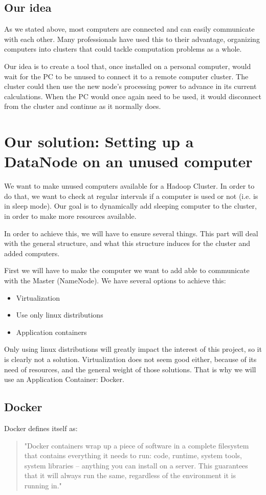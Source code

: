 \documentclass[11pt]{report} %
\begin{document}
\section{Our idea}
As we stated above, most computers are connected and can easily communicate with each other. Many professionals have used this to their advantage, organizing computers into clusters that could tackle computation problems as a whole.

Our idea is to create a tool that, once installed on a personal computer, would wait for the PC to be unused to connect it to a remote computer cluster. The cluster could then use the new node's processing power to advance in its current calculations. When the PC would once again need to be used, it would disconnect from the cluster and continue as it normally does.

\chapter{Our solution: Setting up a DataNode on an unused computer}
We want to make unused computers available for a Hadoop Cluster. In order to do that, we want to check at regular intervals if a computer is used or not (i.e. is in sleep mode). Our goal is to dynamically add sleeping computer to the cluster, in order to make more resources available.

In order to achieve this, we will have to ensure several things. This part will deal with the general structure, and what this structure induces for the cluster and added computers.

First we will have to make the computer we want to add able to communicate with the Master (NameNode). We have several options to achieve this: \begin{itemize}
\item Virtualization
\item Use only linux distributions
\item Application containers
\end{itemize}
Only using linux distributions will greatly impact the interest of this project, so it is clearly not a solution. Virtualization does not seem good either, because of its need of resources, and the general weight of those solutions. That is why we will use an Application Container: Docker.

\section{Docker}
Docker defines itself as: \begin{quote}"Docker containers wrap up a piece of software in a complete filesystem that contains everything it needs to run: code, runtime, system tools, system libraries – anything you can install on a server. This guarantees that it will always run the same, regardless of the environment it is running in."\end{quote}
\end{document}
